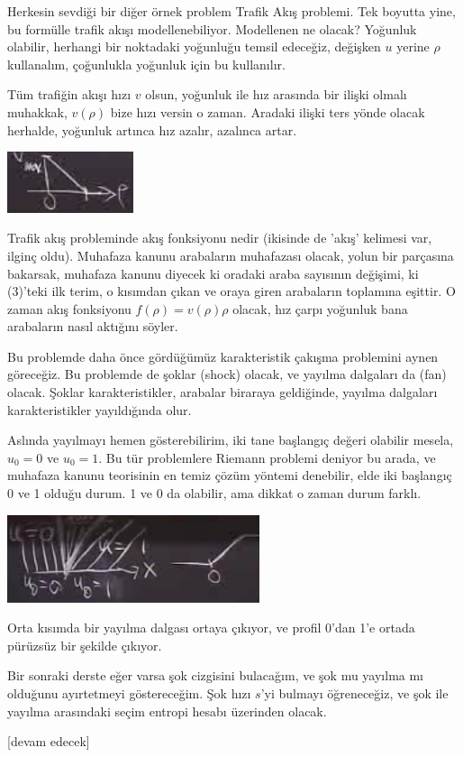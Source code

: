 \documentclass[12pt,fleqn]{article}\usepackage{../../common}
\begin{document}
Herkesin sevdiği bir diğer örnek problem Trafik Akış problemi. Tek boyutta yine,
bu formülle trafik akışı modellenebiliyor. Modellenen ne olacak? Yoğunluk
olabilir, herhangi bir noktadaki yoğunluğu temsil edeceğiz, değişken $u$ yerine
$\rho$ kullanalım, çoğunlukla yoğunluk için bu kullanılır.

Tüm trafiğin akışı hızı $v$ olsun, yoğunluk ile hız arasında bir ilişki olmalı
muhakkak, $v(\rho)$ bize hızı versin o zaman. Aradaki ilişki ters yönde olacak
herhalde, yoğunluk artınca hız azalır, azalınca artar. 

\includegraphics[width=10em]{compscieng_2_08_04.png}

Trafik akış probleminde akış fonksiyonu nedir (ikisinde de 'akış' kelimesi var,
ilginç oldu). Muhafaza kanunu arabaların muhafazası olacak, yolun bir parçasına
bakarsak, muhafaza kanunu diyecek ki oradaki araba sayısının değişimi, ki
(3)'teki ilk terim, o kısımdan çıkan ve oraya giren arabaların toplamına
eşittir. O zaman akış fonksiyonu $f(\rho) = v(\rho) \rho$ olacak, hız çarpı
yoğunluk bana arabaların nasıl aktığını söyler.

Bu problemde daha önce gördüğümüz karakteristik çakışma problemini aynen
göreceğiz. Bu problemde de şoklar (shock) olacak, ve yayılma dalgaları da (fan)
olacak. Şoklar karakteristikler, arabalar biraraya geldiğinde, yayılma dalgaları
karakteristikler yayıldığında olur.

Aslında yayılmayı hemen gösterebilirim, iki tane başlangıç değeri olabilir
mesela, $u_0 = 0$ ve $u_0 = 1$. Bu tür problemlere Riemann problemi deniyor
bu arada, ve muhafaza kanunu teorisinin en temiz çözüm yöntemi denebilir,
elde iki başlangıç 0 ve 1 olduğu durum. 1 ve 0 da olabilir, ama dikkat
o zaman durum farklı.

\includegraphics[width=20em]{compscieng_2_08_05.png}

Orta kısımda bir yayılma dalgası ortaya çıkıyor, ve profil 0'dan 1'e ortada
pürüzsüz bir şekilde çıkıyor. 

Bir sonraki derste eğer varsa şok cizgisini bulacağım, ve şok mu yayılma mı
olduğunu ayırtetmeyi göstereceğim. Şok hızı $s$'yi bulmayı öğreneceğiz, ve şok
ile yayılma arasındaki seçim entropi hesabı üzerinden olacak.








[devam edecek]
  
\end{document}

